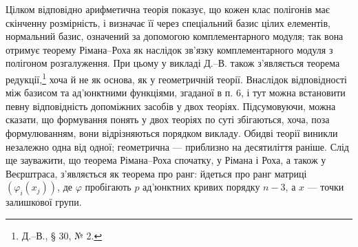\documentclass[11pt]{article}
\begin{document}
Цілком відповідно арифметична теорія показує, що кожен клас полігонів має скінченну розмірність, і визначає її через спеціальний базис цілих елементів, нормальний базис, означений за допомогою комплементарного модуля; так вона отримує теорему Рімана--Роха як наслідок зв'язку комплементарного модуля з полігоном розгалуження. При цьому у викладі Д.--В. також з'являється теорема редукції,\footnote{Д.--В., § 30, № 2.} хоча й не як основа, як у геометричній теорії. Внаслідок відповідності між базисом та ад'юнктними функціями, згаданої в п. 6, і тут можна встановити певну відповідність допоміжних засобів у двох теоріях. Підсумовуючи, можна сказати, що формування понять у двох теоріях по суті збігаються, хоча, поза формулюванням, вони відрізняються порядком викладу. Обидві теорії виникли незалежно одна від одної; геометрична --- приблизно на десятиліття раніше. Слід ще зауважити, що теорема Рімана--Роха спочатку, у Рімана і Роха, а також у Веєрштраса, з'являється як теорема про ранг: йдеться про ранг матриці \((\varphi_i(x_j))\), де \(\varphi\) пробігають \(p\) ад'юнктних кривих порядку \(n-3\), а \(x\) --- точки залишкової групи.
\end{document}
